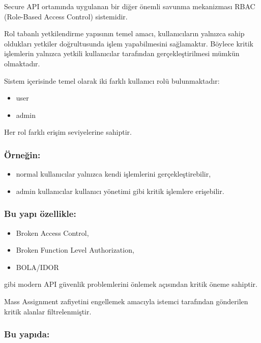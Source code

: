 Secure API ortamında uygulanan bir diğer önemli savunma mekanizması RBAC (Role-Based Access Control) sistemidir.

Rol tabanlı yetkilendirme yapısının temel amacı, kullanıcıların yalnızca sahip oldukları yetkiler doğrultusunda işlem yapabilmesini sağlamaktır. Böylece kritik işlemlerin yalnızca yetkili kullanıcılar tarafından gerçekleştirilmesi mümkün olmaktadır.

Sistem içerisinde temel olarak iki farklı kullanıcı rolü bulunmaktadır:

\begin{itemize}[leftmargin=*]
    \item user
    \item admin
\end{itemize}

Her rol farklı erişim seviyelerine sahiptir.

\subsubsection{Örneğin:}

\begin{itemize}[leftmargin=*]
    \item normal kullanıcılar yalnızca kendi işlemlerini gerçekleştirebilir,
    \item admin kullanıcılar kullanıcı yönetimi gibi kritik işlemlere erişebilir.
\end{itemize}

\subsubsection{Bu yapı özellikle:}

\begin{itemize}[leftmargin=*]
    \item Broken Access Control,
    \item Broken Function Level Authorization,
    \item BOLA/IDOR
\end{itemize}

gibi modern API güvenlik problemlerini önlemek açısından kritik öneme sahiptir.

Mass Assignment zafiyetini engellemek amacıyla istemci tarafından gönderilen kritik alanlar filtrelenmiştir.

\subsubsection{Bu yapıda:}

